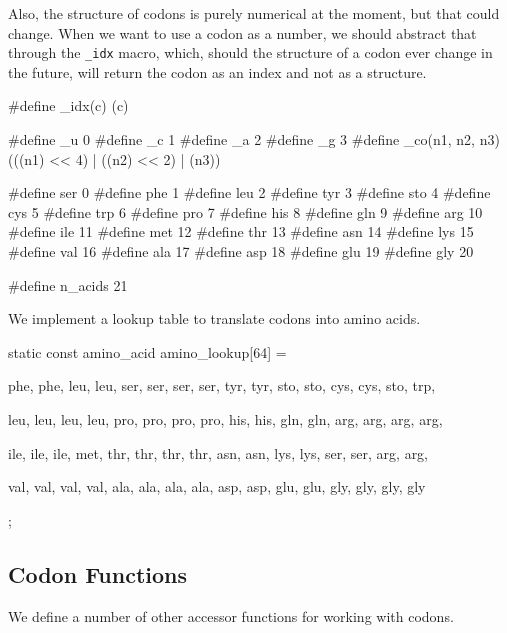 \documentclass{article}
\begin{document}
      Also, the structure of codons is purely numerical at the moment, but that
      could change. When we want to use a codon as a number, we should abstract
      that through the \verb|_idx| macro, which, should the structure of a codon
      ever change in the future, will return the codon as an index and not as a
      structure.

\begin{ccode}
#define _idx(c) (c)

#define _u 0
#define _c 1
#define _a 2
#define _g 3
#define _co(n1, n2, n3) (((n1) << 4) | ((n2) << 2) | (n3))

#define ser 0
#define phe 1
#define leu 2
#define tyr 3
#define sto 4
#define cys 5
#define trp 6
#define pro 7
#define his 8
#define gln 9
#define arg 10
#define ile 11
#define met 12
#define thr 13
#define asn 14
#define lys 15
#define val 16
#define ala 17
#define asp 18
#define glu 19
#define gly 20

#define n_acids 21
\end{ccode}

      We implement a lookup table to translate codons into amino acids.

\begin{ccode}
static const amino_acid amino_lookup[64] = {
    phe, phe, leu, leu,
    ser, ser, ser, ser,
    tyr, tyr, sto, sto,
    cys, cys, sto, trp,

    leu, leu, leu, leu,
    pro, pro, pro, pro,
    his, his, gln, gln,
    arg, arg, arg, arg,

    ile, ile, ile, met,
    thr, thr, thr, thr,
    asn, asn, lys, lys,
    ser, ser, arg, arg,

    val, val, val, val,
    ala, ala, ala, ala,
    asp, asp, glu, glu,
    gly, gly, gly, gly};
\end{ccode}

    \subsection{Codon Functions}
      \label{sec:codon-functions}

      We define a number of other accessor functions for working with codons.
\end{document}
